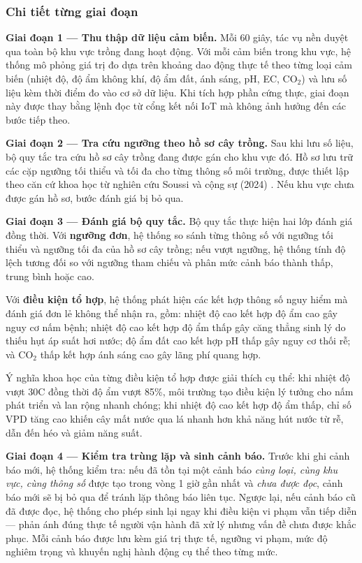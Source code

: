 \documentclass[13pt,a4paper]{extarticle}
\numberwithin{figure}{section}
\numberwithin{table}{section}
\begin{document}
	\subsubsection{Chi tiết từng giai đoạn}
	
	\textbf{Giai đoạn 1 --- Thu thập dữ liệu cảm biến.} Mỗi 60 giây, tác vụ nền duyệt qua toàn bộ khu vực trồng đang hoạt động. Với mỗi cảm biến trong khu vực, hệ thống mô phỏng giá trị đo dựa trên khoảng dao động thực tế theo từng loại cảm biến (nhiệt độ, độ ẩm không khí, độ ẩm đất, ánh sáng, pH, EC, CO$_2$) và lưu số liệu kèm thời điểm đo vào cơ sở dữ liệu. Khi tích hợp phần cứng thực, giai đoạn này được thay bằng lệnh đọc từ cổng kết nối IoT mà không ảnh hưởng đến các bước tiếp theo.
	
	\textbf{Giai đoạn 2 --- Tra cứu ngưỡng theo hồ sơ cây trồng.} Sau khi lưu số liệu, bộ quy tắc tra cứu hồ sơ cây trồng đang được gán cho khu vực đó. Hồ sơ lưu trữ các cặp ngưỡng tối thiểu và tối đa cho từng thông số môi trường, được thiết lập theo căn cứ khoa học từ nghiên cứu Soussi và cộng sự (2024) \cite{soussi2024}. Nếu khu vực chưa được gán hồ sơ, bước đánh giá bị bỏ qua.
	
	\textbf{Giai đoạn 3 --- Đánh giá bộ quy tắc.} Bộ quy tắc thực hiện hai lớp đánh giá đồng thời. Với \textbf{ngưỡng đơn}, hệ thống so sánh từng thông số với ngưỡng tối thiểu và ngưỡng tối đa của hồ sơ cây trồng; nếu vượt ngưỡng, hệ thống tính độ lệch tương đối so với ngưỡng tham chiếu và phân mức cảnh báo thành thấp, trung bình hoặc cao.
	
	Với \textbf{điều kiện tổ hợp}, hệ thống phát hiện các kết hợp thông số nguy hiểm mà đánh giá đơn lẻ không thể nhận ra, gồm: nhiệt độ cao kết hợp độ ẩm cao gây nguy cơ nấm bệnh; nhiệt độ cao kết hợp độ ẩm thấp gây căng thẳng sinh lý do thiếu hụt áp suất hơi nước; độ ẩm đất cao kết hợp pH thấp gây nguy cơ thối rễ; và CO$_2$ thấp kết hợp ánh sáng cao gây lãng phí quang hợp.
	
	Ý nghĩa khoa học của từng điều kiện tổ hợp được giải thích cụ thể: khi nhiệt độ vượt 30\textdegree C đồng thời độ ẩm vượt 85\%, môi trường tạo điều kiện lý tưởng cho nấm phát triển và lan rộng nhanh chóng; khi nhiệt độ cao kết hợp độ ẩm thấp, chỉ số VPD tăng cao khiến cây mất nước qua lá nhanh hơn khả năng hút nước từ rễ, dẫn đến héo và giảm năng suất.
	
	\textbf{Giai đoạn 4 --- Kiểm tra trùng lặp và sinh cảnh báo.} Trước khi ghi cảnh báo mới, hệ thống kiểm tra: nếu đã tồn tại một cảnh báo \textit{cùng loại, cùng khu vực, cùng thông số} được tạo trong vòng 1 giờ gần nhất và \textit{chưa được đọc}, cảnh báo mới sẽ bị bỏ qua để tránh lặp thông báo liên tục. Ngược lại, nếu cảnh báo cũ đã được đọc, hệ thống cho phép sinh lại ngay khi điều kiện vi phạm vẫn tiếp diễn --- phản ánh đúng thực tế người vận hành đã xử lý nhưng vấn đề chưa được khắc phục. Mỗi cảnh báo được lưu kèm giá trị thực tế, ngưỡng vi phạm, mức độ nghiêm trọng và khuyến nghị hành động cụ thể theo từng mức.
	
\end{document}
